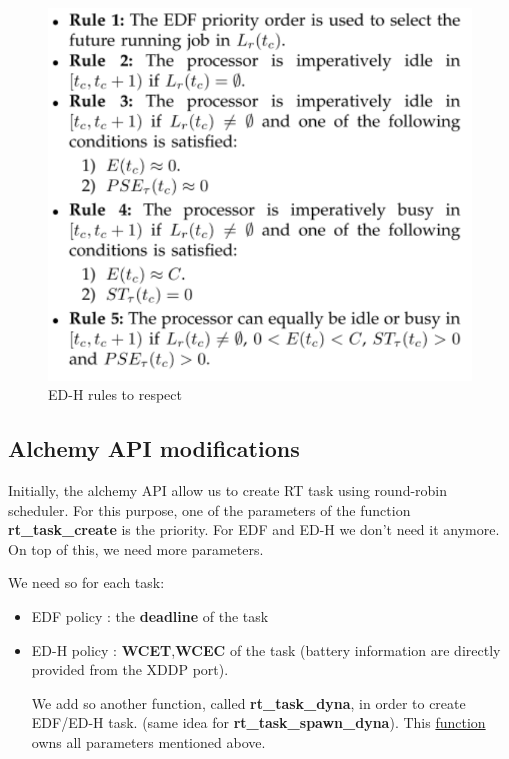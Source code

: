 \documentclass[12pt,hidelinks]{article}
\begin{document}
{\begin{itemize}
\begin{figure}[ht]
\begin{minipage}{0.45\textwidth}
            \includegraphics[width=1.2\textwidth]{EDH_rulesTheory.png} %
            \caption{ED-H rules to respect}
        \end{minipage}
    \end{figure} \newline

	\end{itemize}
	
	\newpage \newpage \subsection{Alchemy API modifications}
	
	Initially, the alchemy API allow us to create RT task using round-robin scheduler. For this purpose, one of the parameters of the function \textbf{rt\_task\_create} is the priority. For EDF and ED-H we don't need it anymore. On top of this, we need more parameters.\newline
	
	We need so for each task:
	\begin{itemize}
	    \item EDF policy : the \textbf{deadline} of the task 
	    \item ED-H policy : \textbf{WCET},\textbf{WCEC} of the task (battery information are directly provided from the XDDP port).
	    
	    We add so another function, called \textbf{rt\_task\_dyna}, in order to create EDF/ED-H task. (same idea for \textbf{rt\_task\_spawn\_dyna}). This \href{https://github.com/skyultime/Xenomai-EDH/blob/final_version/include/alchemy/task.h}{function} owns all parameters mentioned above.
	    

\end{itemize}}
\end{document}
